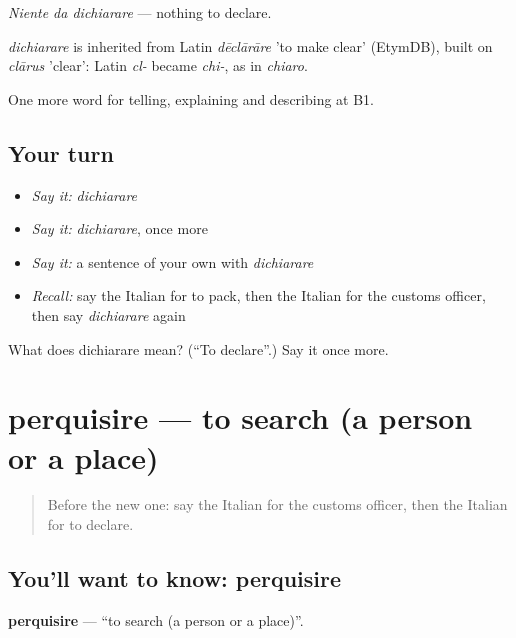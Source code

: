 \emph{Niente da dichiarare} — nothing to declare.

\begin{cousinweb}
\emph{dichiarare} is inherited from Latin \emph{dēclārāre} 'to make clear' (EtymDB), built on \emph{clārus} 'clear': Latin \emph{cl-} became \emph{chi-}, as in \emph{chiaro}.
\end{cousinweb}

\begin{grammarlens}[title={What you've built}]
One more word for telling, explaining and describing at B1.
\end{grammarlens}

\subsection*{Your turn}
\begin{itemize}
\raggedright
  \item \emph{Say it:} \emph{dichiarare}
  \item \emph{Say it:} \emph{dichiarare}, once more
  \item \emph{Say it:} a sentence of your own with \emph{dichiarare}
  \item \emph{Recall:} say the Italian for to pack, then the Italian for the customs officer, then say \emph{dichiarare} again
\end{itemize}

\begin{tcolorbox}[breakable,colback=teal!4,colframe=teal!35!black,title={Before you move on}]
What does dichiarare mean? (\textquotedblleft{}To declare\textquotedblright{}.) Say it once more.
\end{tcolorbox}
\section[perquisire]{perquisire — to search (a person or a place)}

\label{lesson:IT-C427-perquisire}



\begin{quote}
Before the new one: say the Italian for the customs officer, then the Italian for to declare.
\end{quote}

\subsection*{You'll want to know: perquisire}
\textbf{perquisire} — \textquotedblleft{}to search (a person or a place)\textquotedblright{}.

